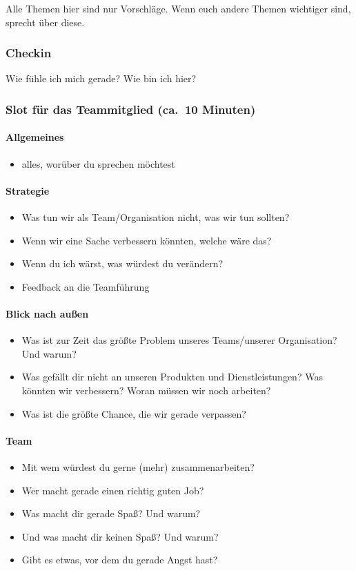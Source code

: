 Alle Themen hier sind nur Vorschläge. Wenn euch andere Themen wichtiger sind, sprecht über diese.

\subsubsection{Checkin}
Wie fühle ich mich gerade? Wie bin ich hier?

\subsubsection{Slot für das Teammitglied (ca.~10 Minuten)}

\paragraph{Allgemeines}
\begin{itemize}
 \item alles, worüber du sprechen möchtest
\end{itemize}

\paragraph{Strategie}
\begin{itemize}
 \item Was tun wir als Team/Organisation nicht, was wir tun sollten?
 \item Wenn wir eine Sache verbessern könnten, welche wäre das?
 \item Wenn du ich wärst, was würdest du verändern?
 \item Feedback an die Teamführung
\end{itemize}

\paragraph{Blick nach außen}
\begin{itemize}
 \item Was ist zur Zeit das größte Problem unseres Teams/unserer Organisation? Und warum?
 \item Was gefällt dir nicht an unseren Produkten und Dienstleistungen? Was könnten wir verbessern? Woran müssen wir noch arbeiten?
 \item Was ist die größte Chance, die wir gerade verpassen?
\end{itemize}

\paragraph{Team}
\begin{itemize}
 \item Mit wem würdest du gerne (mehr) zusammenarbeiten?
 \item Wer macht gerade einen richtig guten Job?
 \item Was macht dir gerade Spaß? Und warum?
 \item Und was macht dir keinen Spaß? Und warum?
 \item Gibt es etwas, vor dem du gerade Angst hast?
\end{itemize}


